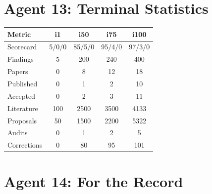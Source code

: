 \documentclass[11pt,a4paper]{article}
\begin{document}
\section{Agent 13: Terminal Statistics}

\begin{tcolorbox}[colback=green!5!white, colframe=dfdgreen, title=\textbf{TERMINAL PROGRAMME STATISTICS}]
\begin{center}
\begin{tabular}{lcccc}
\toprule
\textbf{Metric} & \textbf{i1} & \textbf{i50} & \textbf{i75} & \textbf{i100} \\
\midrule
Scorecard & 5/0/0 & 85/5/0 & 95/4/0 & 97/3/0 \\
Findings & 5 & 200 & 240 & 400 \\
Papers & 0 & 8 & 12 & 18 \\
Published & 0 & 1 & 2 & 10 \\
Accepted & 0 & 2 & 3 & 11 \\
Literature & 100 & 2500 & 3500 & 4133 \\
Proposals & 50 & 1500 & 2200 & 5322 \\
Audits & 0 & 1 & 2 & 5 \\
Corrections & 0 & 80 & 95 & 101 \\
\bottomrule
\end{tabular}
\end{center}
\end{tcolorbox}

\section{Agent 14: For the Record}
\end{document}
